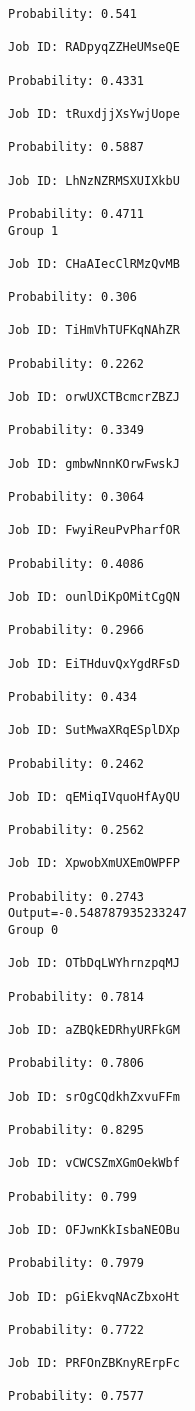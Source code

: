 \documentclass[11pt]{article}
\begin{document}
\begin{Verbatim}[commandchars=\\\{\}]
Probability: 0.541

Job ID: RADpyqZZHeUMseQE

Probability: 0.4331

Job ID: tRuxdjjXsYwjUope

Probability: 0.5887

Job ID: LhNzNZRMSXUIXkbU

Probability: 0.4711
Group 1

Job ID: CHaAIecClRMzQvMB

Probability: 0.306

Job ID: TiHmVhTUFKqNAhZR

Probability: 0.2262

Job ID: orwUXCTBcmcrZBZJ

Probability: 0.3349

Job ID: gmbwNnnKOrwFwskJ

Probability: 0.3064

Job ID: FwyiReuPvPharfOR

Probability: 0.4086

Job ID: ounlDiKpOMitCgQN

Probability: 0.2966

Job ID: EiTHduvQxYgdRFsD

Probability: 0.434

Job ID: SutMwaXRqESplDXp

Probability: 0.2462

Job ID: qEMiqIVquoHfAyQU

Probability: 0.2562

Job ID: XpwobXmUXEmOWPFP

Probability: 0.2743
Output=-0.548787935233247
Group 0

Job ID: OTbDqLWYhrnzpqMJ

Probability: 0.7814

Job ID: aZBQkEDRhyURFkGM

Probability: 0.7806

Job ID: srOgCQdkhZxvuFFm

Probability: 0.8295

Job ID: vCWCSZmXGmOekWbf

Probability: 0.799

Job ID: OFJwnKkIsbaNEOBu

Probability: 0.7979

Job ID: pGiEkvqNAcZbxoHt

Probability: 0.7722

Job ID: PRFOnZBKnyRErpFc

Probability: 0.7577


\end{Verbatim}
\end{document}
